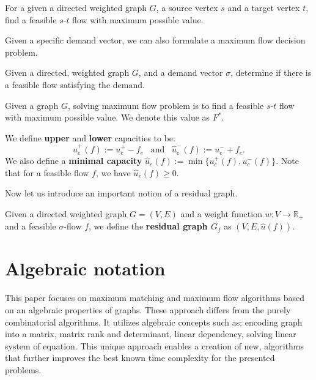 \begin{problem}\label{max_flow_problem}
For a given a directed weighted graph $G$, a source vertex $s$ and a target vertex $t$, find a feasible $s$-$t$ flow with maximum possible value.
\end{problem}

Given a specific demand vector, we can also formulate a maximum flow decision problem.
\begin{problem}
Given a directed, weighted graph $G$, and a demand vector $\sigma$, determine if there is a feasible flow satisfying the demand.
\end{problem}


Given a graph $G$, solving maximum flow problem is to find a feasible $s$-$t$ flow with maximum possible value. We denote this value as $F^*$.

\begin{definition}
We define \textbf{upper} and \textbf{lower} capacities to be:
\[ \hat u_e^+(f) := u_e^+-f_e \hspace{10pt} \text{and} \hspace{10pt} \hat u_e^-(f) := u_e^-+f_e. \]
We also define a \textbf{minimal capacity} $\hat u_e(f) := \min\{u_e^+(f),u_e^-(f)\}$. Note that for a feasible flow $f$, we have $\hat u_e(f) \ge 0$.
\end{definition}

Now let us introduce an important notion of a residual graph.
\begin{definition}
Given a directed weighted graph $G=(V,E)$ and a weight function $w: V \rightarrow \mathbb{R}_+$ and a feasible $\sigma$-flow $f$, we define the \textbf{residual graph $G_f$} as $(V,E,\hat u(f))$. 
\end{definition}

\section{Algebraic notation}
This paper focuses on maximum matching and maximum flow algorithms based on an algebraic properties of graphs. These approach differs from the purely combinatorial algorithms. It utilizes algebraic concepts such as: encoding graph into a matrix, matrix rank and determinant, linear dependency, solving linear system of equation. This unique approach enables a creation of new, algorithms that further improves the best known time complexity for the presented problems.


